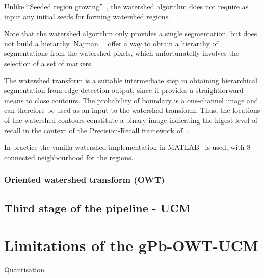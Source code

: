 Unlike ``Seeded region growing''~\cite{adams1994seeded}, the watershed algorithm does not require as input any initial seeds for forming watershed regions.

Note that the watershed algorithm only provides a single segmentation, but does not build a hierarchy. %
Najman~\etal~\cite{najman1996geodesic} offer a way to obtain a hierarchy of segmentations from the watershed pixels, which unfortunatelly involves the selection of a set of markers.

The watershed transform is a suitable intermediate step in obtaining hierarchical segmentation from edge detection output, since it provides a straightforward means to close contours. The probability of boundary is a one-channel image and can therefore be used as an input to the watershed transform. Thus, the locations of the watershed contours constitute a binary image indicating the higest level of recall in the context of the Precision-Recall framework of~\cite{Arbelaez11}. %

In practice the vanilla watershed implementation in MATLAB~\cite{MATLABwatershed} is used, with 8-connected neighbourhood for the regions.

\subsubsection*{Oriented watershed transform (OWT)}
\label{sec:ch3-OWT}

\subsection{Third stage of the pipeline - UCM}
\label{sec:ch3-UCM}

\section{Limitations of the gPb-OWT-UCM} %
Quantisation